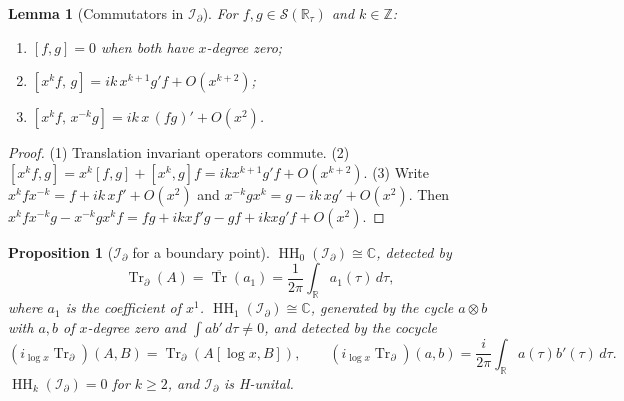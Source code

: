 \documentclass[11pt,oneside,reqno]{article}
\DeclareMathOperator{\HH}{HH}
\DeclareMathOperator{\Tr}{Tr}
\newcommand{\C}{\mathbb C}
\newcommand{\R}{\mathbb R}
\newcommand{\Z}{\mathbb Z}
\newcommand{\cS}{\mathcal S}
\newcommand{\Id}{\mathcal I_\partial}
\newcommand{\Trd}{\Tr_\partial}
\newcommand{\bTr}{\overline{\Tr}}
\newcommand{\lx}{\log x}
\theoremstyle{plain}
\newtheorem{proposition}[theorem]{Proposition}
\newtheorem{lemma}[theorem]{Lemma}
\theoremstyle{definition}
\theoremstyle{remark}
\begin{document}
\begin{lemma}[Commutators in \(\Id\)]\label{lem:commutators}
For \(f,g\in\cS(\R_\tau)\) and \(k\in\Z\):
\begin{enumerate}
\item \([f,g]=0\) when both have \(x\)-degree zero;
\item \([x^kf,\,g]=ik\,x^{k+1}g'f+O(x^{k+2})\);
\item \([x^kf,\,x^{-k}g]=ik\,x\,(fg)'+O(x^2)\).
\end{enumerate}
\end{lemma}

\begin{proof}
(1) Translation invariant operators commute. (2)
\([x^kf,g]=x^k[f,g]+[x^k,g]f=ikx^{k+1}g'f+O(x^{k+2})\). (3) Write
\(x^kfx^{-k}=f+ik\,xf'+O(x^2)\) and \(x^{-k}gx^k=g-ik\,xg'+O(x^2)\). Then
\(x^kfx^{-k}g-x^{-k}gx^kf=fg+ikxf'g-gf+ikxg'f+O(x^2)\).
\end{proof}

\begin{proposition}[\(\Id\) for a boundary point]\label{prop:Idpoint}
\(\HH_0(\Id)\cong\C\), detected by
\[
 \Trd(A)=\bTr(a_1)=\frac1{2\pi}\int_{\R}a_1(\tau)\,d\tau ,
\]
where \(a_1\) is the coefficient of \(x^1\). \(\HH_1(\Id)\cong\C\), generated by the cycle
\(a\otimes b\) with \(a,b\) of \(x\)-degree zero and \(\int ab'\,d\tau
\ne0\), and detected by the cocycle
\[
 (i_{\lx}\Trd)(A,B)=\Trd(A[\lx,B]),\qquad
 (i_{\lx}\Trd)(a,b)=\frac i{2\pi}\int_{\R}a(\tau)b'(\tau)\,d\tau .
\]
\(\HH_k(\Id)=0\) for \(k\ge2\), and \(\Id\) is H-unital.
\end{proposition}
\end{document}

